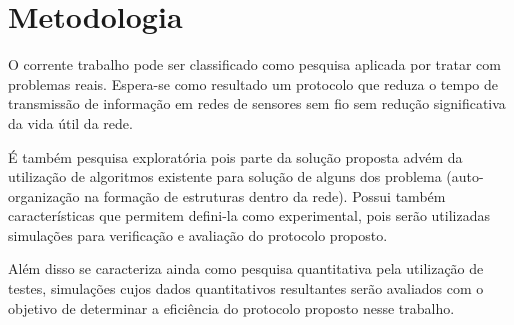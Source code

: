 \section{Metodologia}

O corrente trabalho pode ser classificado como pesquisa aplicada por tratar com problemas reais. Espera-se como resultado um protocolo que reduza o tempo de transmissão de informação em redes de sensores sem fio sem redução significativa da vida útil da rede. 

É também pesquisa exploratória pois parte da solução proposta advém da utilização de algoritmos existente para solução de alguns dos problema (auto-organização na formação de estruturas dentro da rede). Possui também características que permitem defini-la como experimental, pois serão utilizadas simulações para verificação e avaliação do protocolo proposto.

Além disso se caracteriza ainda como pesquisa quantitativa pela utilização de testes, simulações cujos dados quantitativos resultantes serão avaliados com o objetivo de determinar a eficiência do protocolo proposto nesse trabalho.
